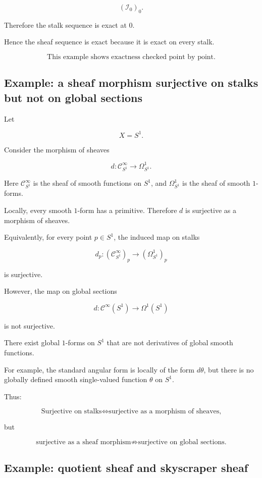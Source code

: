 \documentclass[12pt,a4paper]{article}
\theoremstyle{notespace}
\newcommand{\C}{\mathcal C}
\newcommand{\I}{\mathcal I}
\begin{document}
	\[
	(\I_0)_0.
	\]
	
	Therefore the stalk sequence is exact at $0$.
	
	Hence the sheaf sequence is exact because it is exact on every stalk.
	
	\[
	\boxed{
		\text{This example shows exactness checked point by point.}
	}
	\]
	
	\subsection{Example: a sheaf morphism surjective on stalks but not on global sections}
	
	Let
	
	\[
	X=S^1.
	\]
	
	Consider the morphism of sheaves
	
	\[
	d:\C^\infty_{S^1}\to \Omega^1_{S^1}.
	\]
	
	Here $\C^\infty_{S^1}$ is the sheaf of smooth functions on $S^1$, and
	$\Omega^1_{S^1}$ is the sheaf of smooth $1$-forms.
	
	Locally, every smooth $1$-form has a primitive. Therefore $d$ is surjective as
	a morphism of sheaves.
	
	Equivalently, for every point $p\in S^1$, the induced map on stalks
	
	\[
	d_p:(\C^\infty_{S^1})_p\to(\Omega^1_{S^1})_p
	\]
	
	is surjective.
	
	However, the map on global sections
	
	\[
	d:\C^\infty(S^1)\to \Omega^1(S^1)
	\]
	
	is not surjective.
	
	There exist global $1$-forms on $S^1$ that are not derivatives of global
	smooth functions.
	
	For example, the standard angular form is locally of the form $d\theta$, but
	there is no globally defined smooth single-valued function $\theta$ on $S^1$.
	
	Thus:
	
	\[
	\boxed{
		\text{Surjective on stalks}
		\iff
		\text{surjective as a morphism of sheaves,}
	}
	\]
	
	but
	
	\[
	\boxed{
		\text{surjective as a sheaf morphism}
		\not\Rightarrow
		\text{surjective on global sections.}
	}
	\]
	
	\subsection{Example: quotient sheaf and skyscraper sheaf}
	
\end{document}
